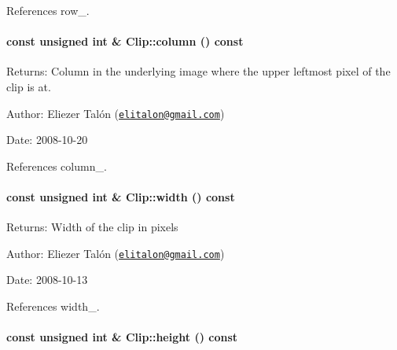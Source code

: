 References row\_\-.\hypertarget{class_clip_06a34378fa0f23425d10bb04e9972a26}{
\paragraph[column]{\setlength{\rightskip}{0pt plus 5cm}const unsigned int \& Clip::column () const}\hfill}
\label{class_clip_06a34378fa0f23425d10bb04e9972a26}


\begin{Desc}
\item[Returns:]Column in the underlying image where the upper leftmost pixel of the clip is at.\end{Desc}
\begin{Desc}
\item[Author:]Eliezer Talón (\href{mailto:elitalon@gmail.com}{\tt elitalon@gmail.com}) \end{Desc}
\begin{Desc}
\item[Date:]2008-10-20 \end{Desc}


References column\_\-.\hypertarget{class_clip_88d1a47c0ec077e8c6680785509389b0}{
\paragraph[width]{\setlength{\rightskip}{0pt plus 5cm}const unsigned int \& Clip::width () const}\hfill}
\label{class_clip_88d1a47c0ec077e8c6680785509389b0}


\begin{Desc}
\item[Returns:]Width of the clip in pixels\end{Desc}
\begin{Desc}
\item[Author:]Eliezer Talón (\href{mailto:elitalon@gmail.com}{\tt elitalon@gmail.com}) \end{Desc}
\begin{Desc}
\item[Date:]2008-10-13 \end{Desc}


References width\_\-.\hypertarget{class_clip_939908a8dde602d25335792cc0fd5d97}{
\paragraph[height]{\setlength{\rightskip}{0pt plus 5cm}const unsigned int \& Clip::height () const}\hfill}
\label{class_clip_939908a8dde602d25335792cc0fd5d97}


